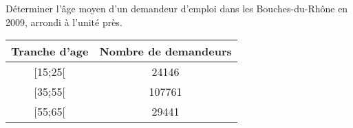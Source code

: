 
Déterminer l’âge moyen d’un demandeur d’emploi dans les Bouches-du-Rhône en 2009, arrondi à l'unité près.

\begin{tabular}{|c|c|}
\hline 
Tranche d'age & Nombre de demandeurs  \\ 
\hline 
[15;25[ & 24146\\ 
\hline 
[35;55[ & 107761  \\ 
\hline 
[55;65[ & 29441  \\ 
\hline  
\end{tabular} 